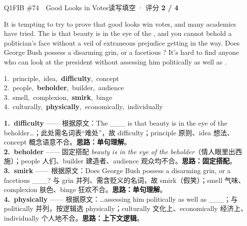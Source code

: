 \begin{qblock}{Q1\quad FIB \#74\ \ Good Looks in Votes}{读写填空 · 评分 \textcolor{cAccent}{\bfseries 2 / 4}}
\begin{promptbox}
It is tempting to try to prove that good looks win votes, and many academics have tried. The  is that beauty is in the eye of the , and you cannot behold a politician's face without a veil of extraneous prejudice getting in the way. Does George Bush possess a disarming grin, or a facetious ? It's hard to find anyone who can look at the president without assessing him politically as well as .
\end{promptbox}
{\small
1.\ principle,\ idea,\ \textbf{difficulty},\ concept\\
2.\ people,\ \textbf{beholder},\ builder,\ audience\\
3.\ smell,\ complexion,\ \textbf{smirk},\ binge\\
4.\ culturally,\ \textbf{physically},\ economically,\ individually}
\begin{notebox}\footnotesize
\textbf{1.\ difficulty} —— 根据原文：The \_\_\_ is that beauty is in the eye of the beholder…；此处需名词表“难处”，故 difficulty；principle 原则、idea 想法、concept 概念语意不合。\textbf{思路：单句理解}。\\[2pt]
\textbf{2.\ beholder} —— 固定搭配 \emph{beauty is in the eye of the beholder}（情人眼里出西施）；people 人们、builder 建造者、audience 观众均不合。\textbf{思路：固定搭配}。\\[2pt]
\textbf{3.\ smirk} —— 根据原文：Does George Bush possess a disarming grin, or a facetious \_\_\_? 与 grin 并列、需含贬义的名词，故 smirk（假笑）；smell 气味、complexion 肤色、binge 狂欢不合。\textbf{思路：单句理解}。\\[2pt]
\textbf{4.\ physically} —— 根据原文：…assessing him politically as well as \_\_\_；与 politically 并列，按逻辑选 physically；culturally 文化上、economically 经济上、individually 个人地不合。\textbf{思路：上下文逻辑}。
\end{notebox}
\end{qblock}

